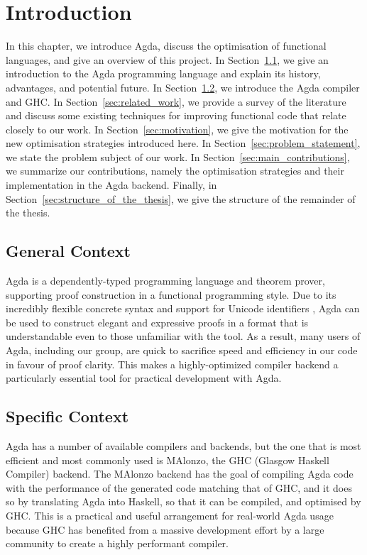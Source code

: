 \chapter{Introduction}
\label{cha:introduction}

In this chapter, we introduce Agda, discuss the optimisation of functional languages, and give an overview of this project. In Section~\ref{sec:general_context}, we give an introduction to the Agda programming language and explain its history, advantages, and potential future. In Section~\ref{sec:specific_context}, we introduce the Agda compiler and GHC. In Section~\ref{sec:related_work}, we provide a survey of the literature and discuss some existing techniques for improving functional code that relate closely to our work. In Section~\ref{sec:motivation}, we give the motivation for the new optimisation strategies introduced here. In Section~\ref{sec:problem_statement}, we state the problem subject of our work. In Section~\ref{sec:main_contributions}, we summarize our contributions, namely the optimisation strategies and their implementation in the Agda backend. Finally, in Section~\ref{sec:structure_of_the_thesis}, we give the structure of the remainder of the thesis.

\section{General Context}
\label{sec:general_context}

Agda \cite{norell2007} is a dependently-typed programming language and theorem prover, supporting proof construction in a functional programming style. Due to its incredibly flexible concrete syntax and support for Unicode identifiers \cite{bove2009}, Agda can be used to construct elegant and expressive proofs in a format that is understandable even to those unfamiliar with the tool. As a result, many users of Agda, including our group, are quick to sacrifice speed and efficiency in our code in favour of proof clarity. This makes a highly-optimized compiler backend a particularly essential tool for practical development with Agda.

\section{Specific Context}
\label{sec:specific_context}

Agda has a number of available compilers and backends, but the one that is most efficient and most commonly used is MAlonzo, the GHC (Glasgow Haskell Compiler) backend.\cite{benke2007} The MAlonzo backend has the goal of compiling Agda code with the performance of the generated code matching that of GHC, and it does so by translating Agda into Haskell, so that it can be compiled, and optimised by GHC. This is a practical and useful arrangement for real-world Agda usage because GHC has benefited from a massive development effort by a large community to create a highly performant compiler.\cite{benke2007}

